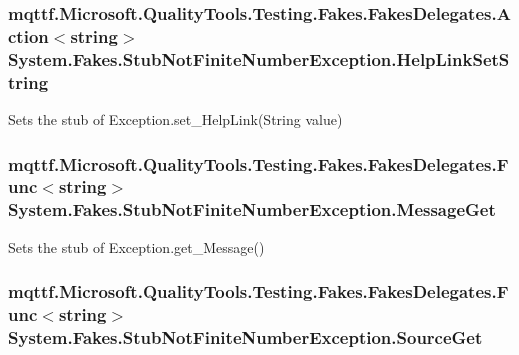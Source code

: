 \hypertarget{class_system_1_1_fakes_1_1_stub_not_finite_number_exception_a8eb16142bbb2d8659207544d951794ff}{
\subsubsection[{Help\-Link\-Set\-String}]{\setlength{\rightskip}{0pt plus 5cm}mqttf.\-Microsoft.\-Quality\-Tools.\-Testing.\-Fakes.\-Fakes\-Delegates.\-Action$<$string$>$ System.\-Fakes.\-Stub\-Not\-Finite\-Number\-Exception.\-Help\-Link\-Set\-String}}\label{class_system_1_1_fakes_1_1_stub_not_finite_number_exception_a8eb16142bbb2d8659207544d951794ff}


Sets the stub of Exception.\-set\-\_\-\-Help\-Link(\-String value)

\hypertarget{class_system_1_1_fakes_1_1_stub_not_finite_number_exception_a3d4c583c7f1d634528b4baa34922deeb}{
\subsubsection[{Message\-Get}]{\setlength{\rightskip}{0pt plus 5cm}mqttf.\-Microsoft.\-Quality\-Tools.\-Testing.\-Fakes.\-Fakes\-Delegates.\-Func$<$string$>$ System.\-Fakes.\-Stub\-Not\-Finite\-Number\-Exception.\-Message\-Get}}\label{class_system_1_1_fakes_1_1_stub_not_finite_number_exception_a3d4c583c7f1d634528b4baa34922deeb}


Sets the stub of Exception.\-get\-\_\-\-Message()

\hypertarget{class_system_1_1_fakes_1_1_stub_not_finite_number_exception_ab3068dce5bef6aaa97534e986688cf6d}{
\subsubsection[{Source\-Get}]{\setlength{\rightskip}{0pt plus 5cm}mqttf.\-Microsoft.\-Quality\-Tools.\-Testing.\-Fakes.\-Fakes\-Delegates.\-Func$<$string$>$ System.\-Fakes.\-Stub\-Not\-Finite\-Number\-Exception.\-Source\-Get}}\label{class_system_1_1_fakes_1_1_stub_not_finite_number_exception_ab3068dce5bef6aaa97534e986688cf6d}



